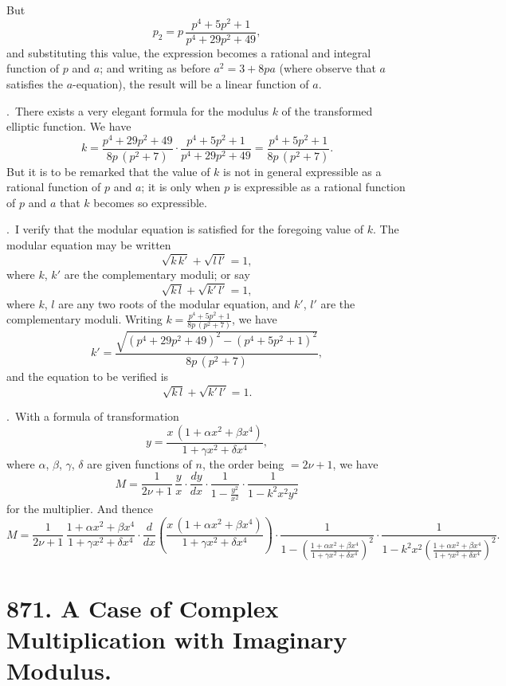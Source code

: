 \documentclass[11pt,a4paper]{book}
\begin{document}
But
\[
p_{2} = p\,\frac{p^{4} + 5p^{2} + 1}{p^{4} + 29p^{2} + 49},
\]
and substituting this value, the expression becomes a rational and integral function of $p$ and $a$; and writing as before $a^{2} = 3 + 8pa$ (where observe that $a$ satisfies the $a$-equation), the result will be a linear function of $a$.

\bigskip{}.\ There exists a very elegant formula for the modulus $k$ of the transformed elliptic function. We have
\[
k = \frac{p^{4} + 29p^{2} + 49}{8p\,(p^{2}+7)} \cdot \frac{p^{4} + 5p^{2} + 1}{p^{4} + 29p^{2} + 49} = \frac{p^{4} + 5p^{2} + 1}{8p\,(p^{2}+7)}.
\]
But it is to be remarked that the value of $k$ is not in general expressible as a rational function of $p$ and $a$; it is only when $p$ is expressible as a rational function of $p$ and $a$ that $k$ becomes so expressible.

\bigskip{}.\ I verify that the modular equation is satisfied for the foregoing value of $k$. The modular equation may be written
\[
\sqrt{k\,k'} + \sqrt{l\,l'} = 1,
\]
where $k$, $k'$ are the complementary moduli; or say
\[
\sqrt{k\,l} + \sqrt{k'\,l'} = 1,
\]
where $k$, $l$ are any two roots of the modular equation, and $k'$, $l'$ are the complementary moduli. Writing $k = \frac{p^{4} + 5p^{2} + 1}{8p\,(p^{2}+7)}$, we have
\[
k' = \frac{\sqrt{(p^{4} + 29p^{2} + 49)^{2} - (p^{4} + 5p^{2} + 1)^{2}}}{8p\,(p^{2}+7)},
\]
and the equation to be verified is
\[
\sqrt{k\,l} + \sqrt{k'\,l'} = 1.
\]

\bigskip{}.\ With a formula of transformation
\[
y = \frac{x\,(1 + \alpha x^{2} + \beta x^{4})}{1 + \gamma x^{2} + \delta x^{4}},
\]
where $\alpha$, $\beta$, $\gamma$, $\delta$ are given functions of $n$, the order being $= 2\nu + 1$, we have
\[
M = \frac{1}{2\nu+1}\,\frac{y}{x} \cdot \frac{dy}{dx} \cdot \frac{1}{1 - \frac{y^{2}}{x^{2}}} \cdot \frac{1}{1 - k^{2}x^{2}y^{2}}
\]
for the multiplier. And thence
\[
M = \frac{1}{2\nu+1}\,\frac{1 + \alpha x^{2} + \beta x^{4}}{1 + \gamma x^{2} + \delta x^{4}} \cdot \frac{d}{dx}\left(\frac{x\,(1 + \alpha x^{2} + \beta x^{4})}{1 + \gamma x^{2} + \delta x^{4}}\right) \cdot \frac{1}{1 - \left(\frac{1 + \alpha x^{2} + \beta x^{4}}{1 + \gamma x^{2} + \delta x^{4}}\right)^{2}} \cdot \frac{1}{1 - k^{2}x^{2}\left(\frac{1 + \alpha x^{2} + \beta x^{4}}{1 + \gamma x^{2} + \delta x^{4}}\right)^{2}}.
\]

\newpage
\section[871]{871. A Case of Complex Multiplication with Imaginary Modulus.}
\label{sec:871}
\end{document}
